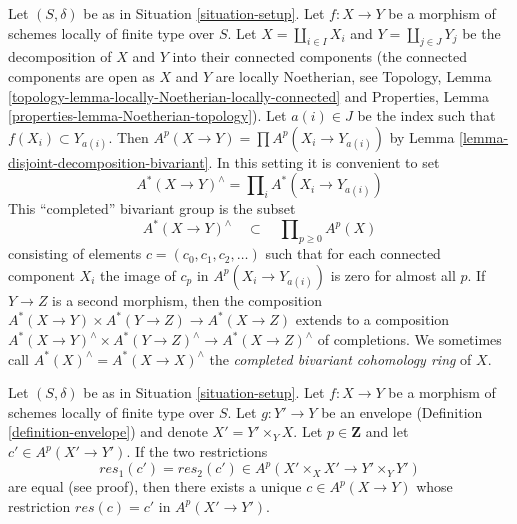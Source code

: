\begin{remark}
\label{remark-completion-bivariant}
Let $(S, \delta)$ be as in Situation \ref{situation-setup}.
Let $f : X \to Y$ be a morphism of schemes locally of finite type over $S$.
Let $X = \coprod_{i \in I} X_i$ and $Y = \coprod_{j \in J} Y_j$
be the decomposition of $X$ and $Y$ into their connected components
(the connected components are open as $X$ and $Y$ are locally Noetherian, see
Topology, Lemma \ref{topology-lemma-locally-Noetherian-locally-connected} and
Properties, Lemma \ref{properties-lemma-Noetherian-topology}).
Let $a(i) \in J$ be the index such that $f(X_i) \subset Y_{a(i)}$.
Then $A^p(X \to Y) = \prod A^p(X_i \to Y_{a(i)})$ by
Lemma \ref{lemma-disjoint-decomposition-bivariant}.
In this setting it is convenient to set
$$
A^*(X \to Y)^\wedge = \prod\nolimits_i A^*(X_i \to Y_{a(i)})
$$
This ``completed'' bivariant group is the subset
$$
A^*(X \to Y)^\wedge \quad\subset\quad \prod\nolimits_{p \geq 0} A^p(X)
$$
consisting of elements $c = (c_0, c_1, c_2, \ldots)$ such that
for each connected component $X_i$ the image of $c_p$ in
$A^p(X_i \to Y_{a(i)})$ is zero for almost all $p$.
If $Y \to Z$ is a second morphism, then the
composition $A^*(X \to Y) \times A^*(Y \to Z) \to A^*(X \to Z)$
extends to a composition
$A^*(X \to Y)^\wedge \times A^*(Y \to Z)^\wedge \to A^*(X \to Z)^\wedge$
of completions. 
We sometimes call $A^*(X)^\wedge = A^*(X \to X)^\wedge$ the
{\it completed bivariant cohomology ring} of $X$.
\end{remark}

\begin{lemma}
\label{lemma-envelope-bivariant}
Let $(S, \delta)$ be as in Situation \ref{situation-setup}.
Let $f : X \to Y$ be a morphism of schemes locally of finite type over $S$.
Let $g : Y' \to Y$ be an envelope (Definition \ref{definition-envelope})
and denote $X' = Y' \times_Y X$. Let $p \in \mathbf{Z}$ and let
$c' \in A^p(X' \to Y')$. If the two restrictions
$$
res_1(c') = res_2(c') \in A^p(X' \times_X X' \to Y' \times_Y Y')
$$
are equal (see proof), then there exists a unique $c \in A^p(X \to Y)$
whose restriction $res(c) = c'$ in $A^p(X' \to Y')$.
\end{lemma}

